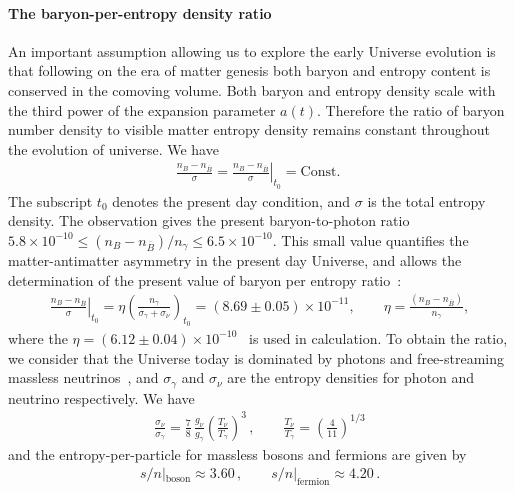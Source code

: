 {\paragraph{The baryon-per-entropy density ratio}
An important assumption allowing us to explore the early Universe evolution is that following on the era of matter genesis both baryon and entropy content is conserved in the comoving volume. Both baryon and entropy density scale with the third power of the expansion parameter $a(t)$. Therefore the ratio of baryon number density to visible matter entropy density remains constant throughout the evolution of universe. We have 
\begin{align}
\frac{n_B-n_{\overline{B}}}{\sigma}= \left.\frac{n_B-n_{\overline{B}}}{ \sigma}\right|_{t_0}=\mathrm{Const.}\;
\end{align}
The subscript $t_0$ denotes the present day condition, and $\sigma$ is the total entropy density.
The observation gives the present baryon-to-photon ratio ~\cite{ParticleDataGroup:2022pth} $5.8 \times 10^{-10} \leqslant(n_B-n_{\overline{B}})/n_\gamma\leqslant6.5\times10^{-10}$. This small value quantifies the matter-antimatter asymmetry in the present day Universe, and allows the determination of the present value of baryon per entropy ratio~\cite{Rafelski:2019twp,Fromerth:2002wb,Fromerth:2012fe}:
\begin{align}\label{BaryonEntropyRatio}
\left.\frac{n_B-n_{\overline{B}}}{ \sigma}\right|_{t_0}=\eta\left(\frac{n_\gamma}{\sigma_\gamma+\sigma_\nu}\right)_{\!t_0}\!\!\!\!=(8.69\pm0.05)\!\!\times\!\!10^{-11},\qquad \eta=\frac{(n_B-n_{\overline{B}})}{n_\gamma},
\end{align}
where the $\eta=(6.12\pm0.04)\times10^{-10}$~\cite{ParticleDataGroup:2022pth} is used in calculation. To obtain the ratio, we consider that the Universe today is dominated by photons and free-streaming massless neutrinos~\cite{Birrell:2012gg}, and $\sigma_\gamma$ and $\sigma_\nu$ are the entropy densities for photon and neutrino respectively. We have
\begin{align}
    \frac{\sigma_\nu}{\sigma_\gamma}=\frac{7}{8}\,\frac{g_\nu}{g_\gamma}\left(\frac{T_\nu}{T_\gamma}\right)^3\,,\qquad\frac{T_\nu}{T_\gamma}=\left(\frac{4}{11}\right)^{1/3}
\end{align}
and the entropy-per-particle for massless bosons and fermions are given by~\cite{Fromerth:2012fe}
\begin{align}
s/n|_\mathrm{boson}\approx 3.60\,,\qquad
s/n|_\mathrm{fermion}\approx 4.20\,.

\end{align}}
